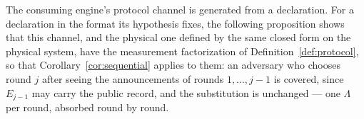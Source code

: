 
The consuming engine's protocol channel is generated from a declaration. For a
declaration in the format its hypothesis fixes, the following proposition
shows that this channel, and the physical one defined by the same closed form
on the physical system, have the measurement factorization of
Definition~\ref{def:protocol}, so that Corollary~\ref{cor:sequential} applies
to them: an adversary who chooses round $j$ after seeing the announcements of
rounds $1,\dots,j-1$ is covered, since $E_{j-1}$ may carry the public record,
and the substitution is unchanged --- one $\Lambda$ per round, absorbed round
by round.


